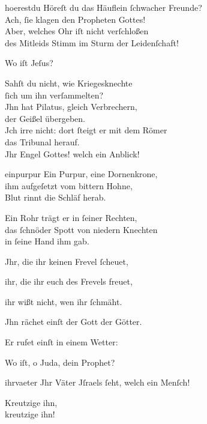 \documentclass[abbrwidth=6em,tocstyle=ref-genre,toe=false]{ees}
\begin{document}
{\begin{movement}{hoerestdu}
  \voice[Blindgebohrner]
  Höreſt du das Häuflein ſchwacher Freunde?\\
  Ach, ſie klagen den Propheten Gottes!\\
  Aber, welches Ohr iſt nicht verſchloßen\\
  des Mitleids Stimm im Sturm der Leidenſchaft!

  \voice[Fremdling]
  Wo iſt Jeſus?

  \voice[Blindgebohrner]
  Sahſt du nicht, wie Kriegesknechte\\
  ſich um ihn verſammelten?\\
  Jhn hat Pilatus, gleich Verbrechern,\\
  der Geißel übergeben.\\
  Jch irre nicht: dort ſteigt er mit dem Römer\\
  das Tribunal herauf.\\
  Jhr Engel Gottes! welch ein Anblick!
\end{movement}

\begin{movement}{einpurpur}\enlargethispage\baselineskip
  \voice[Blindgebohrner]
  Ein Purpur, eine Dornenkrone,\\
  ihm aufgeſetzt vom bittern Hohne,\\
  Blut rinnt die Schläf herab.

  \voice[Fremdling]
  Ein Rohr trägt er in ſeiner Rechten,\\
  das ſchnöder Spott von niedern Knechten\\
  in ſeine Hand ihm gab.

  \voice[Blindgebohrner]
  Jhr, die ihr keinen Frevel ſcheuet,

  \voice[Fremdling]
  ihr, die ihr euch des Frevels freuet,

  \voice[beyde]
  ihr wißt nicht, wen ihr ſchmäht.

  \voice[Blindgebohrner]
  Jhn rächet einſt der Gott der Götter.

  \voice[Fremdling]
  Er rufet einſt in einem Wetter:

  \voice[beyde]
  Wo iſt, o Juda, dein Prophet?
\end{movement}

\begin{movement}{ihrvaeter}
  \voice[Pilatus]
  Jhr Väter Jſraels ſeht, welch ein Menſch!

  Kreutzige ihn,\\
  kreutzige ihn!


\end{movement}}
\end{document}
